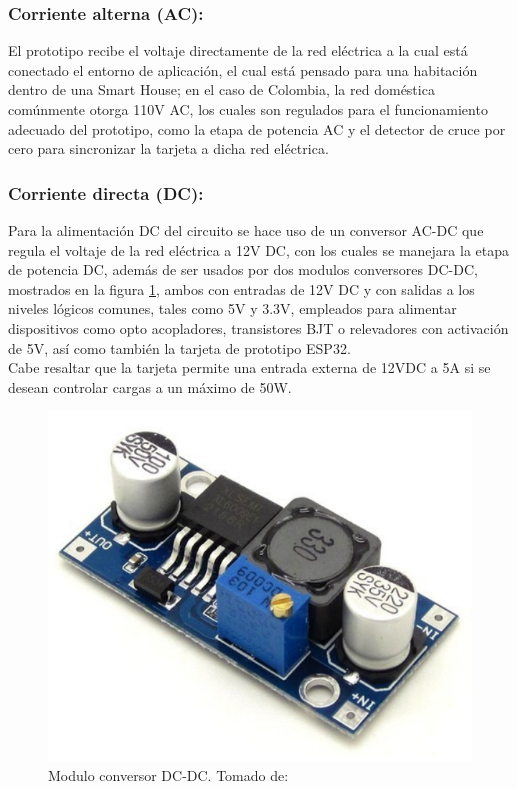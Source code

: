 	\subsubsection{Corriente alterna (AC):}
		El prototipo recibe el voltaje directamente de la red eléctrica a la cual está conectado el entorno de aplicación, el cual está pensado para una habitación dentro de una Smart House; en el caso de Colombia, la red doméstica comúnmente otorga 110V AC, los cuales son regulados para el funcionamiento adecuado del prototipo,  como la etapa de potencia AC y el detector de cruce por cero para sincronizar la tarjeta a dicha red eléctrica.\\
		
	\subsubsection{Corriente directa (DC):}
		Para la alimentación DC del circuito se hace uso de un conversor AC-DC que regula el voltaje de la red eléctrica a 12V DC, con los cuales se manejara la etapa de potencia DC, además de ser usados por dos modulos conversores DC-DC, mostrados en la figura \ref{fig:DCDC}, ambos con entradas de 12V DC y con salidas a los niveles lógicos comunes, tales como 5V y 3.3V, empleados para alimentar dispositivos como opto acopladores,  transistores BJT o relevadores con activación de 5V, así como también la tarjeta de 	prototipo ESP32.\\
		
		Cabe resaltar que la tarjeta permite una entrada externa de 12VDC a 5A si se desean controlar cargas a un máximo de 50W.\\
			
		\begin{figure}[H]
			\centering
			\caption{Modulo conversor DC-DC. Tomado de: \cite{DCDC}}
			\label{fig:DCDC}
			\includegraphics[width=0.5\linewidth]{Imagenes/DCDC}
		\end{figure}
	

